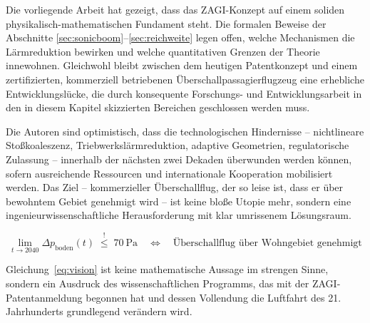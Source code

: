 ﻿\documentclass[12pt,a4paper]{article}
\theoremstyle{definition}
\theoremstyle{remark}
\begin{document}
Die vorliegende Arbeit hat gezeigt, dass das ZAGI-Konzept auf einem soliden
physikalisch-mathematischen Fundament steht. Die formalen Beweise der Abschnitte
\ref{sec:sonicboom}--\ref{sec:reichweite} legen offen, welche Mechanismen die
Lärmreduktion bewirken und welche quantitativen Grenzen der Theorie innewohnen.
Gleichwohl bleibt zwischen dem heutigen Patentkonzept und einem zertifizierten,
kommerziell betriebenen Überschallpassagierflugzeug eine erhebliche Entwicklungslücke,
die durch konsequente Forschungs- und Entwicklungsarbeit in den in diesem Kapitel
skizzierten Bereichen geschlossen werden muss.

Die Autoren sind optimistisch, dass die technologischen Hindernisse -- nichtlineare
Stoßkoaleszenz, Triebwerkslärmreduktion, adaptive Geometrien, regulatorische Zulassung --
innerhalb der nächsten zwei Dekaden überwunden werden können, sofern ausreichende
Ressourcen und internationale Kooperation mobilisiert werden. Das Ziel -- kommerzieller
Überschallflug, der so leise ist, dass er über bewohntem Gebiet genehmigt wird --
ist keine bloße Utopie mehr, sondern eine ingenieurwissenschaftliche Herausforderung
mit klar umrissenem Lösungsraum.

\begin{equation}
    \lim_{t \to 2040} \Delta p_\text{boden}(t) \;\overset{!}{\le}\; \SI{70}{\pascal}
    \quad \Leftrightarrow \quad
    \text{Überschallflug über Wohngebiet genehmigt}
  \label{eq:vision}
\end{equation}

\noindent
Gleichung~\eqref{eq:vision} ist keine mathematische Aussage im strengen Sinne, sondern
ein Ausdruck des wissenschaftlichen Programms, das mit der ZAGI-Patentanmeldung begonnen
hat und dessen Vollendung die Luftfahrt des 21. Jahrhunderts grundlegend verändern wird.
\end{document}
